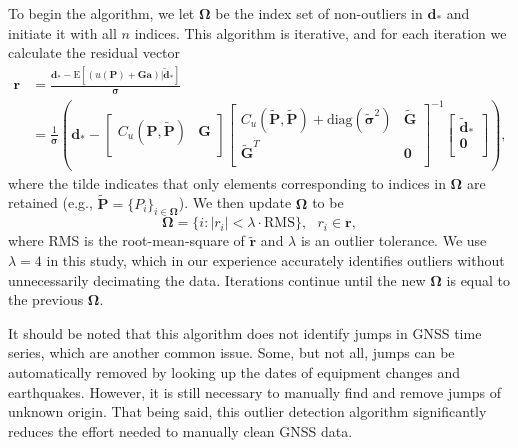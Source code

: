 To begin the algorithm, we let $\mathbf{\Omega}$ be the index set of non-outliers in $\mathbf{d}_*$ and initiate it with all $n$ indices. This algorithm is iterative, and for each iteration we calculate the residual vector
\begin{align}\label{ch5:eq:Residual}
\mathbf{r} &= \frac{\mathbf{d}_* - \mathrm{E}\left[(u(\mathbf{P}) + \mathbf{G}\mathbf{a})|\tilde{\mathbf{d}}_* \right]}{\mathbf{\sigma}} \\
       &= \frac{1}{\mathbf{\sigma}}\left(\mathbf{d}_*  - 
          \left[\begin{array}{cc}
                C_u(\mathbf{P},\tilde{\mathbf{P}}) & \mathbf{G} \\
                \end{array}\right]
          \left[\begin{array}{cc}
                C_u(\tilde{\mathbf{P}},\tilde{\mathbf{P}}) + \mathrm{diag}(\tilde{\mathbf{\sigma}}^2) & \tilde{\mathbf{G}} \\
                \tilde{\mathbf{G}}^T  & \mathbf{0} \\
                \end{array}\right]^{-1}
          \left[\begin{array}{c}
                \tilde{\mathbf{d}}_* \\
                \mathbf{0} \\
                \end{array}\right]\right),
\end{align}
where the tilde indicates that only elements corresponding to indices in $\mathbf{\Omega}$ are retained (e.g., $\tilde{\mathbf{P}} = \{P_i\}_{i\in\mathbf{\Omega}}$). We then update $\mathbf{\Omega}$ to be
\begin{equation}\label{ch5:eq:Update}
\mathbf{\Omega} = \{i : |r_i| < \lambda \cdot \mathrm{RMS}\}, \ \ \ r_i \in \mathbf{r},
\end{equation} 
where RMS is the root-mean-square of $\tilde{\mathbf{r}}$ and $\lambda$ is an outlier tolerance. We use $\lambda=4$ in this study, which in our experience accurately identifies outliers without unnecessarily decimating the data. Iterations continue until the new $\mathbf{\Omega}$ is equal to the previous $\mathbf{\Omega}$. 

It should be noted that this algorithm does not identify jumps in GNSS time series, which are another common issue. Some, but not all, jumps can be automatically removed by looking up the dates of equipment changes and earthquakes. However, it is still necessary to manually find and remove jumps of unknown origin. That being said, this outlier detection algorithm significantly reduces the effort needed to manually clean GNSS data.       

